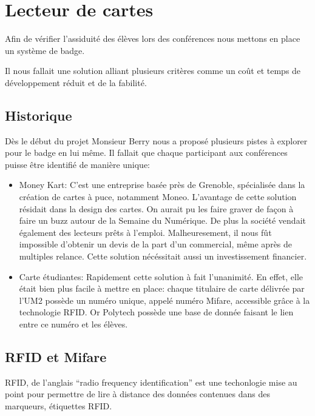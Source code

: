 \chapter{Lecteur de cartes}
Afin de vérifier l'assiduité des élèves lors des conférences nous mettons en
place un système de badge.

Il nous fallait une solution alliant plusieurs critères comme un coût et temps
de développement réduit et de la fabilité.

\newpage



\section{Historique}
Dès le début du projet Monsieur Berry nous a proposé plusieurs pistes à 
explorer pour le badge en lui même. Il fallait que chaque participant aux
conférences puisse être identifié de manière unique:

\begin{itemize}
\item Money Kart: C'est une entreprise basée près de Grenoble, spécialisée
dans la création de cartes à puce, notamment Moneo. L'avantage de cette solution
résidait dans la design des cartes. On aurait pu les faire graver
de façon à faire un buzz autour de la Semaine du Numérique. De plus la société
vendait également des lecteurs prêts à l'emploi.
Malheuresement, il nous fût impossible d'obtenir un devis de la part d'un
commercial, même après de multiples relance. Cette solution nécéssitait aussi
un investissement financier.

\item Carte étudiantes: Rapidement cette solution à fait l'unanimité. En effet,
elle était bien plus facile à mettre en place: chaque titulaire de carte délivrée
par l'UM2 possède un numéro unique, appelé numéro Mifare, accessible grâce à
la technologie RFID. Or Polytech possède une base de donnée faisant le lien entre
ce numéro et les élèves.
\end{itemize}

\section{RFID et Mifare}
RFID, de l'anglais ``radio frequency identification'' est une techonlogie 
mise au point pour permettre de lire à distance des données contenues dans des
marqueurs, étiquettes RFID.

